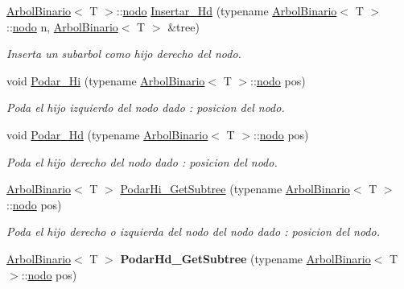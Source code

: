 \begin{DoxyCompactItemize}
\hyperlink{classArbolBinario}{Arbol\+Binario}$<$ T $>$\+::\hyperlink{classArbolBinario_1_1nodo}{nodo} \hyperlink{classArbolBinario_a7e0b2453f969c6289809aaba1f03fe62}{Insertar\+\_\+\+Hd} (typename \hyperlink{classArbolBinario}{Arbol\+Binario}$<$ T $>$\+::\hyperlink{classArbolBinario_1_1nodo}{nodo} n, \hyperlink{classArbolBinario}{Arbol\+Binario}$<$ T $>$ \&tree)
\begin{DoxyCompactList}\small\item\em Inserta un subarbol como hijo derecho del nodo. \end{DoxyCompactList}\item 
\mbox{\label{classArbolBinario_afaa11ef16d36b20bb116a1ec892e0e46}} 
void \hyperlink{classArbolBinario_afaa11ef16d36b20bb116a1ec892e0e46}{Podar\+\_\+\+Hi} (typename \hyperlink{classArbolBinario}{Arbol\+Binario}$<$ T $>$\+::\hyperlink{classArbolBinario_1_1nodo}{nodo} pos)
\begin{DoxyCompactList}\small\item\em Poda el hijo izquierdo del nodo dado \+: posicion del nodo. \end{DoxyCompactList}\item 
\mbox{\label{classArbolBinario_a08564b2f73b4013437572860de8aafad}} 
void \hyperlink{classArbolBinario_a08564b2f73b4013437572860de8aafad}{Podar\+\_\+\+Hd} (typename \hyperlink{classArbolBinario}{Arbol\+Binario}$<$ T $>$\+::\hyperlink{classArbolBinario_1_1nodo}{nodo} pos)
\begin{DoxyCompactList}\small\item\em Poda el hijo derecho del nodo dado \+: posicion del nodo. \end{DoxyCompactList}\item 
\hyperlink{classArbolBinario}{Arbol\+Binario}$<$ T $>$ \hyperlink{classArbolBinario_ae48b89acb45fc83cc67ca8e78e31f903}{Podar\+Hi\+\_\+\+Get\+Subtree} (typename \hyperlink{classArbolBinario}{Arbol\+Binario}$<$ T $>$\+::\hyperlink{classArbolBinario_1_1nodo}{nodo} pos)
\begin{DoxyCompactList}\small\item\em Poda el hijo derecho o izquierda del nodo del nodo dado \+: posicion del nodo. \end{DoxyCompactList}\item 
\mbox{\label{classArbolBinario_a2292c407fe19a90088d9c1e23b58bdbd}} 
\hyperlink{classArbolBinario}{Arbol\+Binario}$<$ T $>$ {\bfseries Podar\+Hd\+\_\+\+Get\+Subtree} (typename \hyperlink{classArbolBinario}{Arbol\+Binario}$<$ T $>$\+::\hyperlink{classArbolBinario_1_1nodo}{nodo} pos)

\end{DoxyCompactItemize}
